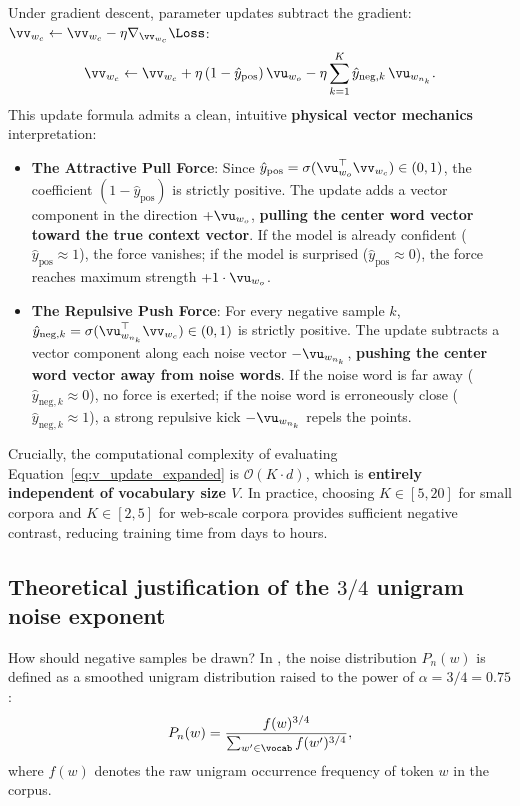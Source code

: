 \documentclass[../../main.tex]{subfiles}
\begin{document}
Under gradient descent, parameter updates subtract the gradient: $\vv_{w_c} \leftarrow \vv_{w_c} - \eta \nabla_{\vv_{w_c}} \Loss$:
\begin{equation}
\label{eq:v_update_expanded}
\vv_{w_c} \leftarrow \vv_{w_c} + \eta \left( 1 - \hat{y}_{\text{pos}} \right) \vu_{w_o} - \eta \sum_{k=1}^K \hat{y}_{\text{neg}, k} \, \vu_{w_{n_k}}.
\end{equation}
This update formula admits a clean, intuitive \textbf{physical vector mechanics} interpretation:
\begin{itemize}
    \item \textbf{The Attractive Pull Force}: Since $\hat{y}_{\text{pos}} = \sigma(\vu_{w_o}^\top \vv_{w_c}) \in (0, 1)$, the coefficient $(1 - \hat{y}_{\text{pos}})$ is strictly positive. The update adds a vector component in the direction $+\vu_{w_o}$, \textbf{pulling the center word vector toward the true context vector}. If the model is already confident ($\hat{y}_{\text{pos}} \approx 1$), the force vanishes; if the model is surprised ($\hat{y}_{\text{pos}} \approx 0$), the force reaches maximum strength $+1 \cdot \vu_{w_o}$.
    \item \textbf{The Repulsive Push Force}: For every negative sample $k$, $\hat{y}_{\text{neg}, k} = \sigma(\vu_{w_{n_k}}^\top \vv_{w_c}) \in (0, 1)$ is strictly positive. The update subtracts a vector component along each noise vector $-\vu_{w_{n_k}}$, \textbf{pushing the center word vector away from noise words}. If the noise word is far away ($\hat{y}_{\text{neg}, k} \approx 0$), no force is exerted; if the noise word is erroneously close ($\hat{y}_{\text{neg}, k} \approx 1$), a strong repulsive kick $-\vu_{w_{n_k}}$ repels the points.
\end{itemize}

Crucially, the computational complexity of evaluating Equation~\eqref{eq:v_update_expanded} is $\mathcal{O}(K \cdot d)$, which is \textbf{entirely independent of vocabulary size $V$}. In practice, choosing $K \in [5, 20]$ for small corpora and $K \in [2, 5]$ for web-scale corpora provides sufficient negative contrast, reducing training time from days to hours.

\subsection{Theoretical justification of the \texorpdfstring{$3/4$}{3/4} unigram noise exponent}
\label{subsec:unigram_three_quarters}

How should negative samples be drawn? In \cite{mikolov2013distributed}, the noise distribution $P_n(w)$ is defined as a smoothed unigram distribution raised to the power of $\alpha = 3/4 = 0.75$:
\begin{equation}
\label{eq:unigram_three_quarters}
P_n(w) = \frac{f(w)^{3/4}}{\sum_{w' \in \vocab} f(w')^{3/4}},
\end{equation}
where $f(w)$ denotes the raw unigram occurrence frequency of token $w$ in the corpus.
\end{document}
